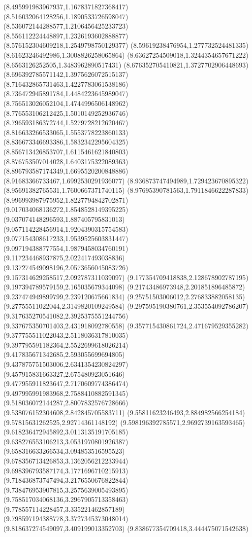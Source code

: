 {(8.495991983967937,1.1678371827368417)
(8.516032064128256,1.1890533726598047)
(8.536072144288577,1.2106456425233723)
(8.556112224448897,1.2326193602888877)
(8.576152304609218,1.2549798750129377)
(8.59619238476954,1.277732524481335)
(8.61623246492986,1.3008826258065864)
(8.63627254509018,1.3244354657671222)
(8.6563126252505,1.3483962890517431)
(8.676352705410821,1.3727702906448693)
(8.696392785571142,1.3975626072515137)
(8.716432865731463,1.4227783061538186)
(8.736472945891784,1.4484223645989047)
(8.756513026052104,1.4744996506148962)
(8.776553106212425,1.5010149252936746)
(8.796593186372744,1.5279728212620467)
(8.816633266533065,1.5553778223860133)
(8.836673346693386,1.5832342295604325)
(8.856713426853707,1.6115461621840803)
(8.876753507014028,1.6403175322089363)
(8.896793587174349,1.6695520200848886)
(8.91683366733467,1.6992530291936077)
(8.936873747494989,1.729423670895322)
(8.95691382765531,1.7600667371740115)
(8.97695390781563,1.7911846622287833)
(8.996993987975952,1.8227794842702871)
(9.017034068136272,1.8548528149395225)
(9.037074148296593,1.887405795831013)
(9.057114228456914,1.9204390315754583)
(9.077154308617233,1.9539525603831447)
(9.097194388777554,1.9879458034760191)
(9.117234468937875,2.022417493038836)
(9.137274549098196,2.0573656045083726)
(9.157314629258517,2.092787311039097)
(9.177354709418838,2.128678902787195)
(9.197394789579159,2.165035679344098)
(9.21743486973948,2.201851896485872)
(9.237474949899799,2.239120675661834)
(9.25751503006012,2.276833882058135)
(9.27755511022044,2.3149820109249584)
(9.297595190380761,2.353554092786207)
(9.317635270541082,2.3925375551244756)
(9.337675350701403,2.431918092780558)
(9.357715430861724,2.471679529355282)
(9.377755511022043,2.5118036317810035)
(9.397795591182364,2.5522699618026214)
(9.417835671342685,2.593055699694805)
(9.437875751503006,2.6341354230824297)
(9.457915831663327,2.675480923051646)
(9.477955911823647,2.7170609774386474)
(9.497995991983968,2.7588410882591345)
(9.518036072144287,2.8007832576728666)
(9.538076152304608,2.842845705583711)
(9.55811623246493,2.884982566254184)
(9.57815631262525,2.92714361148192)
(9.598196392785571,2.9692739163593465)
(9.618236472945892,3.0113135191705185)
(9.638276553106213,3.0531970801926387)
(9.658316633266534,3.094853516595523)
(9.678356713426853,3.1362056212233944)
(9.698396793587174,3.1771696710215913)
(9.718436873747494,3.2176550676822844)
(9.738476953907815,3.2575639005493895)
(9.758517034068136,3.2967905713358463)
(9.778557114228457,3.335221462857189)
(9.798597194388778,3.3727345373048014)
(9.818637274549097,3.409199013352703)
(9.838677354709418,3.444475071542638)
}
